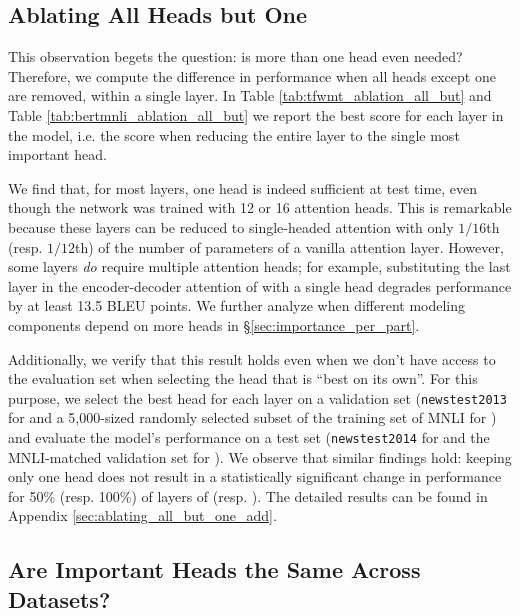 \subsection{Ablating All Heads but One}
\label{sec:ablating_all_but_one}

This observation begets the question: is more than one head even needed? Therefore, we compute the difference in performance when all heads except one are removed, within a single layer. In Table \ref{tab:tfwmt_ablation_all_but} and Table \ref{tab:bertmnli_ablation_all_but} we report the best score for each layer in the model, i.e. the score when reducing the entire layer to the single most important head.

We find that, for most layers, one head is indeed sufficient at test time, even though the network was trained with 12 or 16 attention heads. This is remarkable because these layers can be reduced to single-headed attention with only $1/16$th (resp. $1/12$th) of the number of parameters of a vanilla attention layer.
However, some layers \emph{do} require multiple attention heads; for example, substituting the last layer in the encoder-decoder attention of \tfwmt{} with a single head degrades performance by at least 13.5 BLEU points.
We further analyze when different modeling components depend on more heads in \S\ref{sec:importance_per_part}.



Additionally, we verify that this result holds even when we don't have access to the evaluation set when selecting the head that is ``best on its own''. For this purpose, we select the best head for each layer on a validation set (\texttt{newstest2013} for \tfwmt{} and a 5,000-sized randomly selected subset of the training set of MNLI for \bertmnli{}) and evaluate the model's performance on a test set (\texttt{newstest2014} for \tfwmt{} and the MNLI-matched validation set for \bertmnli{}). We observe that similar findings hold: keeping only one head does not result in a statistically significant change in performance for 50\% (resp. 100\%) of layers of \tfwmt{} (resp. \bertmnli{}). The detailed results can be found in Appendix \ref{sec:ablating_all_but_one_add}.



\subsection{Are Important Heads the Same Across Datasets?}
\label{sec:across_datasets}

